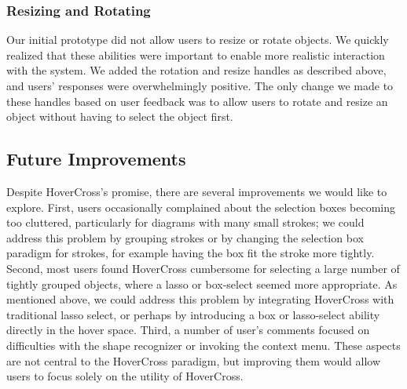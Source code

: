 \documentclass{article}
\begin{document}
\subsubsection{Resizing and Rotating} Our initial prototype did not allow users to resize or rotate objects.  We quickly realized that these abilities were important to enable more realistic interaction with the system.  
We added the rotation and resize handles as described above, and users' responses were overwhelmingly positive.  The only change we made to these handles based on user feedback was to allow users to rotate and resize an object without having 
to select the object first.


\subsection{Future Improvements}

Despite HoverCross's promise, there are several improvements we would like to explore.  
First, users occasionally complained about the selection boxes becoming too cluttered, particularly for diagrams with many small strokes; we could address this problem by grouping strokes or by changing the selection box paradigm for strokes, for example having the box fit the stroke more tightly.  Second, most users found HoverCross cumbersome for selecting a large number of tightly grouped objects, where a lasso or box-select seemed more appropriate.  As mentioned above, we could address this problem by integrating HoverCross with traditional lasso select, or perhaps by introducing a box or lasso-select ability directly in the hover space.  Third, a number of user's comments focused on difficulties with the shape recognizer or invoking the context menu.  These aspects are not central to the HoverCross paradigm, but improving them would allow users to focus solely on the utility of HoverCross.  


\end{document}
